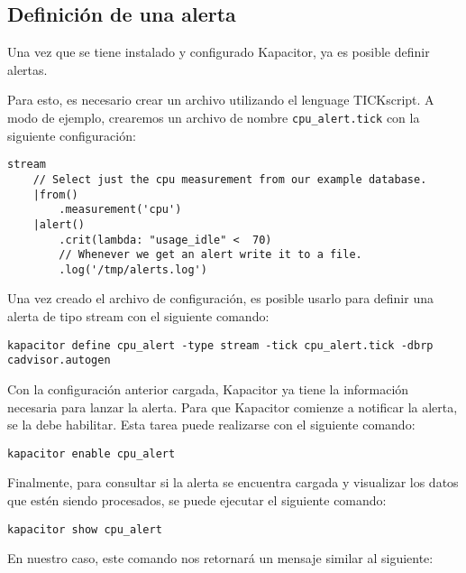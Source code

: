 \subsection{Definición de una alerta}
\label{definir-alerta}

Una vez que se tiene instalado y configurado Kapacitor, ya es posible definir alertas.

Para esto, es necesario crear un archivo utilizando el lenguage TICKscript. A modo de ejemplo, crearemos un archivo de nombre \texttt{cpu\_alert.tick} con la siguiente configuración:

\begin{lstlisting}
stream
    // Select just the cpu measurement from our example database.
    |from()
        .measurement('cpu')
    |alert()
        .crit(lambda: "usage_idle" <  70)
        // Whenever we get an alert write it to a file.
        .log('/tmp/alerts.log')
\end{lstlisting}

Una vez creado el archivo de configuración, es posible usarlo para definir una alerta de tipo stream con el siguiente comando:

\begin{lstlisting}
kapacitor define cpu_alert -type stream -tick cpu_alert.tick -dbrp cadvisor.autogen
\end{lstlisting}

Con la configuración anterior cargada, Kapacitor ya tiene la información necesaria para lanzar la alerta. Para que Kapacitor comienze a notificar la alerta, se la debe habilitar. Esta tarea puede realizarse con el siguiente comando:

\begin{lstlisting}
kapacitor enable cpu_alert
\end{lstlisting}

Finalmente, para consultar si la alerta se encuentra cargada y visualizar los datos que estén siendo procesados, se puede ejecutar el siguiente comando:

\begin{lstlisting}
kapacitor show cpu_alert
\end{lstlisting}

En nuestro caso, este comando nos retornará un mensaje similar al siguiente:

